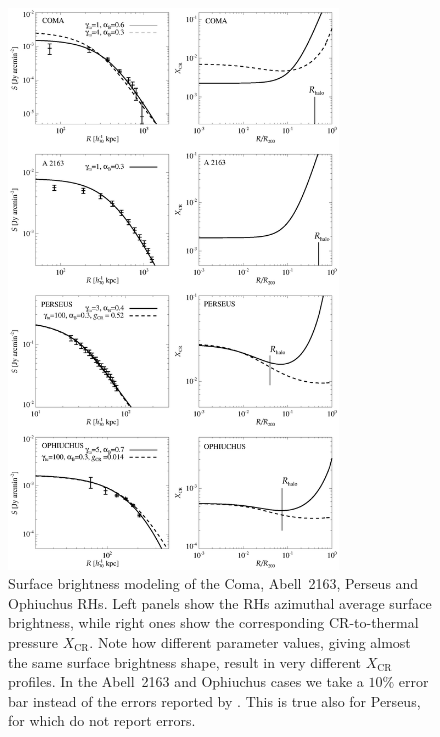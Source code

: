 \documentclass[traditabstract]{aa}
\newcommand{\rmn}{\mathrm}
\begin{document}
\begin{table}[t]
\end{table}

\begin{figure}[t!]
\centering
\includegraphics[width=0.78\textwidth]{figures/SB_profiles_ALL.eps}
\caption{Surface brightness modeling of the Coma, Abell~2163, Perseus and Ophiuchus RHs. Left panels show the RHs azimuthal average surface brightness, while right ones show the corresponding CR-to-thermal pressure $X_{\rmn{CR}}$. Note how different parameter values, giving almost the same surface brightness shape, result in very different $X_{\rmn{CR}}$ profiles. In the Abell~2163 and Ophiuchus cases we take a $10\%$ error bar instead of the errors reported by \cite{2009A&A...499..679M}. This is true also for Perseus, for which \cite{1990MNRAS.246..477P} do not report errors.}
\label{fig:SBmodeling}
\end{figure}
\end{document}
